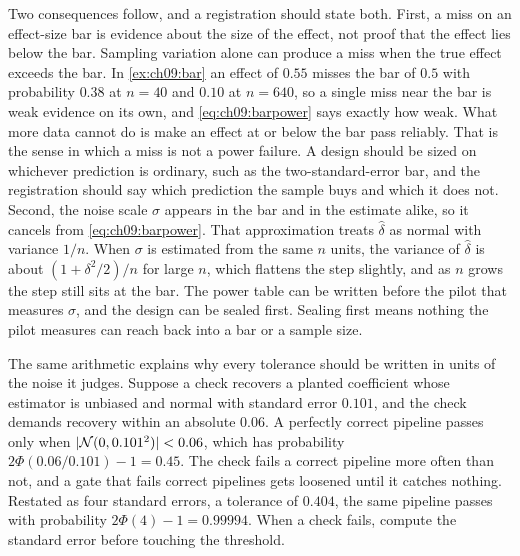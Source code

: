 Two consequences follow, and a registration should state both. First, a miss on an effect-size bar is evidence about the size of the effect, not proof that the effect lies below the bar. Sampling variation alone can produce a miss when the true effect exceeds the bar. In \cref{ex:ch09:bar} an effect of $0.55$ misses the bar of $0.5$ with probability $0.38$ at $n=40$ and $0.10$ at $n=640$, so a single miss near the bar is weak evidence on its own, and \eqref{eq:ch09:barpower} says exactly how weak. What more data cannot do is make an effect at or below the bar pass reliably. That is the sense in which a miss is not a power failure. A design should be sized on whichever prediction is ordinary, such as the two-standard-error bar, and the registration should say which prediction the sample buys and which it does not. Second, the noise scale $\sigma$ appears in the bar and in the estimate alike, so it cancels from \eqref{eq:ch09:barpower}. That approximation treats $\hat\delta$ as normal with variance $1/n$. When $\sigma$ is estimated from the same $n$ units, the variance of $\hat\delta$ is about $(1+\delta^2/2)/n$ for large $n$, which flattens the step slightly, and as $n$ grows the step still sits at the bar. The power table can be written before the pilot that measures $\sigma$, and the design can be sealed first. Sealing first means nothing the pilot measures can reach back into a bar or a sample size.

The same arithmetic explains why every tolerance should be written in units of the noise it judges. Suppose a check recovers a planted coefficient whose estimator is unbiased and normal with standard error $0.101$, and the check demands recovery within an absolute $0.06$. A perfectly correct pipeline passes only when $|\mathcal{N}(0,0.101^2)|<0.06$, which has probability $2\Phi(0.06/0.101)-1=0.45$. The check fails a correct pipeline more often than not, and a gate that fails correct pipelines gets loosened until it catches nothing. Restated as four standard errors, a tolerance of $0.404$, the same pipeline passes with probability $2\Phi(4)-1=0.99994$. When a check fails, compute the standard error before touching the threshold.


